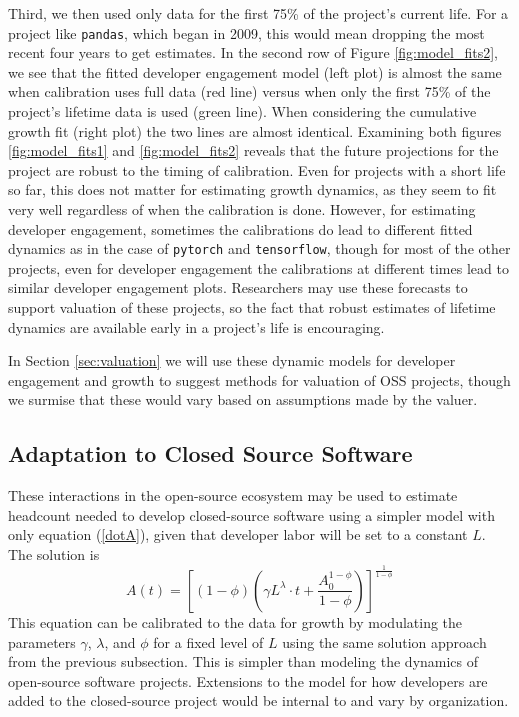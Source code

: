 \documentclass[conference]{IEEEtran}
\begin{document}
Third, we then used only data for the first 75\% of the project's current life. For a project like {\tt pandas}, which began in 2009, this would mean dropping the most recent four years to get estimates. In the second row of Figure \ref{fig:model_fits2}, we see that the fitted developer engagement model (left plot) is almost the same when calibration uses full data (red line) versus when only the first 75\% of the project's lifetime data is used (green line). When considering the cumulative growth fit (right plot) the two lines are almost identical. Examining both figures \ref{fig:model_fits1} and \ref{fig:model_fits2} reveals that the future projections for the project are robust to the timing of calibration. Even for projects with a short life so far, this does not  matter for estimating growth dynamics, as they seem to fit very well regardless of when the calibration is done. However, for estimating developer engagement, sometimes the calibrations do lead to different fitted dynamics as in the case of {\tt pytorch} and {\tt tensorflow}, though for most of the other projects, even for developer engagement the calibrations at different times lead to similar developer engagement plots. Researchers may use these forecasts to support valuation of these projects, so the fact that robust estimates of lifetime dynamics are available early in a project's life is encouraging. 

In Section \ref{sec:valuation} we will use these dynamic models for developer engagement and growth to suggest methods for valuation of OSS projects, though we surmise that these would vary based on assumptions made by the valuer. 





\subsection{Adaptation to Closed Source Software}

These interactions in the open-source ecosystem may be used to estimate headcount needed to develop closed-source software using a simpler model with only equation (\ref{dotA}), given that developer labor will be set to a constant $L$. The solution is 
\begin{equation}
A(t) = \left[(1-\phi)\left(\gamma L^{\lambda}\cdot t + \frac{A_0^{1-\phi}}{1-\phi} \right) \right]^{\frac{1}{1-\phi}} \label{n0}
\end{equation}
This equation can be calibrated to the data for growth by modulating the parameters $\gamma$, $\lambda$, and $\phi$ for a fixed level of $L$ using the same solution approach from the previous subsection. This is simpler than modeling the dynamics of open-source software projects. Extensions to the model for how developers are added to the closed-source project would be internal to and vary by organization. 
\end{document}

